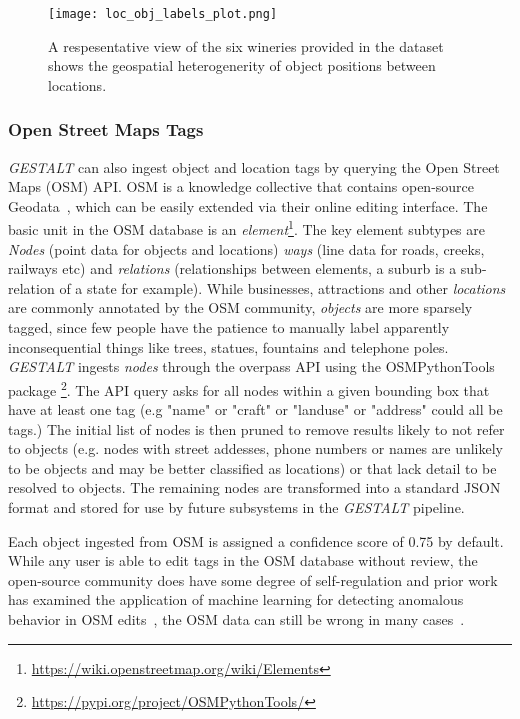 \begin{figure*}[ht]
    \texttt{[image: loc\_obj\_labels\_plot.png]}
    \centering
    \caption[width=\textwidth]{A respesentative view of the six wineries provided in the dataset shows the geospatial heterogenerity of object positions between locations.}
    \label{fig:loc-obj}  
\end{figure*}


\subsubsection{Open Street Maps Tags}
\emph{GESTALT} can also ingest object and location tags by querying the Open Street Maps (OSM) API.
OSM is a knowledge collective that contains open-source Geodata~\cite{Haklay2008}, which can be easily extended via their online editing interface. 
The basic unit in the OSM database is an \textit{element}\footnote{\href{https://wiki.openstreetmap.org/wiki/Elements}{https://wiki.openstreetmap.org/wiki/Elements}}. 
The key element subtypes are \textit{Nodes} (point data for objects and locations) \textit{ways} (line data for roads, creeks, railways etc) and \textit{relations} (relationships between elements, a suburb is a sub-relation of a state for example).
While businesses, attractions and other \textit{locations} are commonly annotated by the OSM community, \textit{objects} are more sparsely tagged, since few people have the patience to manually label apparently inconsequential things like trees, statues, fountains and telephone poles. 
\emph{GESTALT} ingests \textit{nodes} through the overpass API using the OSMPythonTools package \footnote{\href{https://pypi.org/project/OSMPythonTools/}{https://pypi.org/project/OSMPythonTools/}}. 
The API query asks for all nodes within a given bounding box that have at least one tag (e.g "name" or "craft" or "landuse" or "address" could all be tags.)
The initial list of nodes is then pruned to remove results likely to not refer to objects (e.g. nodes with street addesses, phone numbers or names are unlikely to be objects and may be better classified as locations) or that lack detail to be resolved to objects.
The remaining nodes are transformed into a standard JSON format and stored for use by future subsystems in the \emph{GESTALT} pipeline. 

Each object ingested from OSM is assigned a confidence score of 0.75 by default.
While any user is able to edit tags in the OSM database without review, the open-source community does have some degree of self-regulation and prior work has examined the application of machine learning for detecting anomalous behavior in OSM edits~\cite{Mooney2017}, the OSM data can still be wrong in many cases~\cite{VargasMunoz2020}.


